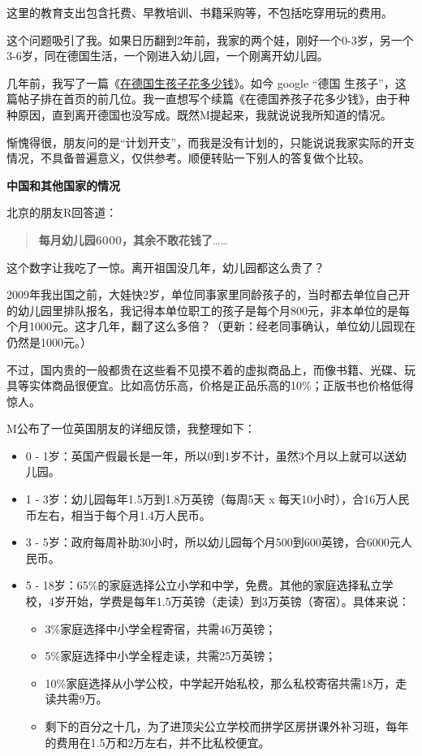 \documentclass[twoside,openright,headings=optiontohead]{ctexbook} %
\providecommand{\tightlist}{%
   \setlength{\itemsep}{0pt}\setlength{\parskip}{0pt}}
\begin{document}
{这里的教育支出包含托费、早教培训、书籍采购等，不包括吃穿用玩的费用。

这个问题吸引了我。如果日历翻到2年前，我家的两个娃，刚好一个0-3岁，另一个3-6岁，同在德国生活，一个刚进入幼儿园，一个刚离开幼儿园。

几年前，我写了一篇《\href{http://dapengde.com/archives/17426}{在德国生孩子花多少钱}》。如今
google ``德国
生孩子''，这篇帖子排在首页的前几位。我一直想写个续篇《在德国养孩子花多少钱》，由于种种原因，直到离开德国也没写成。既然M提起来，我就说说我所知道的情况。

惭愧得很，朋友问的是``计划开支''，而我是没有计划的，只能说说我家实际的开支情况，不具备普遍意义，仅供参考。顺便转贴一下别人的答复做个比较。

\textbf{中国和其他国家的情况}

北京的朋友R回答道：

\begin{quote}
\textbf{每月幼儿园6000，其余不敢花钱了}\ldots{}\ldots{}
\end{quote}

这个数字让我吃了一惊。离开祖国没几年，幼儿园都这么贵了？

2009年我出国之前，大娃快2岁，单位同事家里同龄孩子的，当时都去单位自己开的幼儿园里排队报名，我记得本单位职工的孩子是每个月800元，非本单位的是每个月1000元。这才几年，翻了这么多倍？（更新：经老同事确认，单位幼儿园现在仍然是1000元。）

不过，国内贵的一般都贵在这些看不见摸不着的虚拟商品上，而像书籍、光碟、玩具等实体商品很便宜。比如高仿乐高，价格是正品乐高的10\%；正版书也价格低得惊人。

M公布了一位英国朋友的详细反馈，我整理如下：

\begin{itemize}
\tightlist
\item
  0 -
  1岁：英国产假最长是一年，所以0到1岁不计，虽然3个月以上就可以送幼儿园。
\item
  1 - 3岁：幼儿园每年1.5万到1.8万英镑（每周5天 x
  每天10小时），合16万人民币左右，相当于每个月1.4万人民币。
\item
  3 -
  5岁：政府每周补助30小时，所以幼儿园每个月500到600英镑，合6000元人民币。
\item
  5 -
  18岁：65\%的家庭选择公立小学和中学，免费。其他的家庭选择私立学校，4岁开始，学费是每年1.5万英镑（走读）到3万英镑（寄宿）。具体来说：

  \begin{itemize}
  \tightlist
  \item
    3\%家庭选择中小学全程寄宿，共需46万英镑；
  \item
    5\%家庭选择中小学全程走读，共需25万英镑；
  \item
    10\%家庭选择从小学公校，中学起开始私校，那么私校寄宿共需18万，走读共需9万。
  \item
    剩下的百分之十几，为了进顶尖公立学校而拼学区房拼课外补习班，每年的费用在1.5万和2万左右，并不比私校便宜。
  \end{itemize}
\end{itemize}

}
\end{document}
